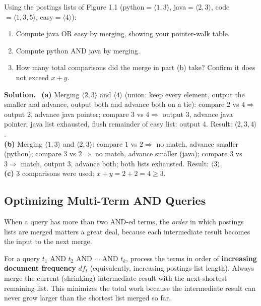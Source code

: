 \documentclass[11pt, a4paper]{article}
\newcommand{\Solution}{\medskip\noindent\textbf{\color{exgreen}Solution.}\ }
\begin{document}
\begin{exercisebox}
Using the postings lists of Figure 1.1 (\textsf{python}$=\langle1,3\rangle$, \textsf{java}$=\langle2,3\rangle$, \textsf{code}$=\langle1,3,5\rangle$, \textsf{easy}$=\langle4\rangle$):
\begin{enumerate}[label=(\alph*)]
  \item Compute \textsf{java OR easy} by merging, showing your pointer-walk table.
  \item Compute \textsf{python AND java} by merging.
  \item How many total comparisons did the merge in part (b) take? Confirm it does not exceed $x+y$.
\end{enumerate}
\end{exercisebox}

\Solution
\textbf{(a)} Merging $\langle2,3\rangle$ and $\langle4\rangle$ (union: keep every element, output the smaller and advance, output both and advance both on a tie): compare $2$ vs $4\Rightarrow$ output 2, advance java pointer; compare $3$ vs $4\Rightarrow$ output 3, advance java pointer; java list exhausted, flush remainder of easy list: output 4. Result: $\langle 2,3,4\rangle$.\\
\textbf{(b)} Merging $\langle1,3\rangle$ and $\langle2,3\rangle$: compare $1$ vs $2\Rightarrow$ no match, advance smaller (python); compare $3$ vs $2\Rightarrow$ no match, advance smaller (java); compare $3$ vs $3\Rightarrow$ match, output 3, advance both; both lists exhausted. Result: $\langle3\rangle$.\\
\textbf{(c)} 3 comparisons were used; $x+y = 2+2 = 4 \ge 3$. \checkmark

\subsection{Optimizing Multi-Term AND Queries}

When a query has more than two \textsf{AND}-ed terms, the \emph{order} in which postings lists are merged matters a great deal, because each intermediate result becomes the input to the next merge.

\begin{formulabox}
For a query $t_1 \text{ AND } t_2 \text{ AND } \cdots \text{ AND } t_k$, process the terms in order of \textbf{increasing document frequency} $df_{t}$ (equivalently, increasing postings-list length). Always merge the current (shrinking) intermediate result with the next-shortest remaining list. This minimizes the total work because the intermediate result can never grow larger than the shortest list merged so far.
\end{formulabox}
\end{document}
